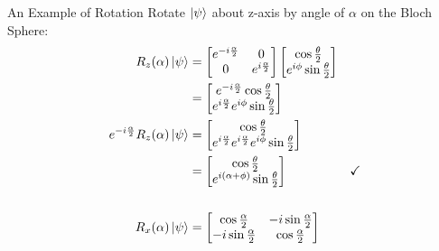 \documentclass{beamer}
\begin{document}
\begin{frame}{An Example of Rotation\tiny\cite{rotationsonblochsphere}}
  {\tiny
    Rotate $\ket\psi$ about z-axis by angle of $\alpha$ on the Bloch Sphere:
  \begin{align*}
    R_z(\alpha)\ket{\psi} &= \begin{bmatrix}
                                e^{-i\frac{\alpha}2} & 0 \\
                                0                    & e^{i\frac{\alpha}2}
                              \end{bmatrix}
                              \begin{bmatrix}
                                \cos{\frac{\theta}2} \\
                                e^{i\phi}\sin{\frac{\theta}2}
                              \end{bmatrix} \\
                          &= \begin{bmatrix}
                               e^{-i\frac{\alpha}2}\cos{\frac{\theta}2} \\
                               e^{i\frac{\alpha}2}e^{i\phi}\sin{\frac{\theta}2}
                             \end{bmatrix} \\
     e^{-i\frac{\alpha}2}R_z(\alpha)\ket{\psi}
                          &= \begin{bmatrix}
                               \cos{\frac{\theta}2} \\
                             e^{i\frac{\alpha}2}e^{i\frac{\alpha}2}e^{i\phi}\sin{\frac{\theta}2}
                             \end{bmatrix} \\
                          &= \begin{bmatrix}
                               \cos{\frac{\theta}2} \\
                               e^{i(\alpha + \phi)}\sin{\frac{\theta}2} \\
                             \end{bmatrix} & \checkmark \\
    \\
    R_x(\alpha)\ket{\psi} &= \begin{bmatrix}
                              \cos\frac{\alpha}2 & -i\sin\frac{\alpha}2 \\
                              -i\sin\frac{\alpha}2 & \cos\frac{\alpha}2
                             \end{bmatrix}

\end{align*}}
\end{frame}
\end{document}
